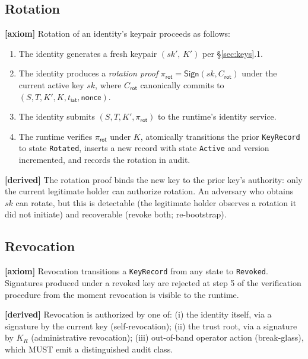 \documentclass[11pt,a4paper]{article}
\newcommand{\axiom}{\textcolor{axiomcolor}{\textbf{[axiom]}}\xspace}
\newcommand{\derived}{\textcolor{derivedcolor}{\textbf{[derived]}}\xspace}
\begin{document}
\subsection{Rotation}

\axiom{} Rotation of an identity's keypair proceeds as follows:

\begin{enumerate}[leftmargin=2em,itemsep=0.15em]
    \item The identity generates a fresh keypair
    $(\mathit{sk}',\,K')$ per \S\ref{sec:keys}.1.
    \item The identity produces a \emph{rotation proof}
    $\pi_{\mathsf{rot}} = \mathsf{Sign}(\mathit{sk},
    C_{\mathsf{rot}})$ under the current active key $\mathit{sk}$,
    where $C_{\mathsf{rot}}$ canonically commits to $(S, T, K', K,
    t_{\mathsf{iat}}, \mathsf{nonce})$.
    \item The identity submits $(S, T, K', \pi_{\mathsf{rot}})$ to
    the runtime's identity service.
    \item The runtime verifies $\pi_{\mathsf{rot}}$ under $K$,
    atomically transitions the prior \texttt{KeyRecord} to state
    \texttt{Rotated}, inserts a new record with state \texttt{Active}
    and version incremented, and records the rotation in audit.
\end{enumerate}

\derived{} The rotation proof binds the new key to the prior key's
authority: only the current legitimate holder can authorize rotation.
An adversary who obtains $\mathit{sk}$ can rotate, but this is
detectable (the legitimate holder observes a rotation it did not
initiate) and recoverable (revoke both; re-bootstrap).

\subsection{Revocation}

\axiom{} Revocation transitions a \texttt{KeyRecord} from any state to
\texttt{Revoked}. Signatures produced under a revoked key are
rejected at step 5 of the verification procedure from the moment
revocation is visible to the runtime.

\derived{} Revocation is authorized by one of: (i) the identity
itself, via a signature by the current key (self-revocation);
(ii) the trust root, via a signature by $K_R$ (administrative
revocation); (iii) out-of-band operator action (break-glass), which
MUST emit a distinguished audit class.
\end{document}
